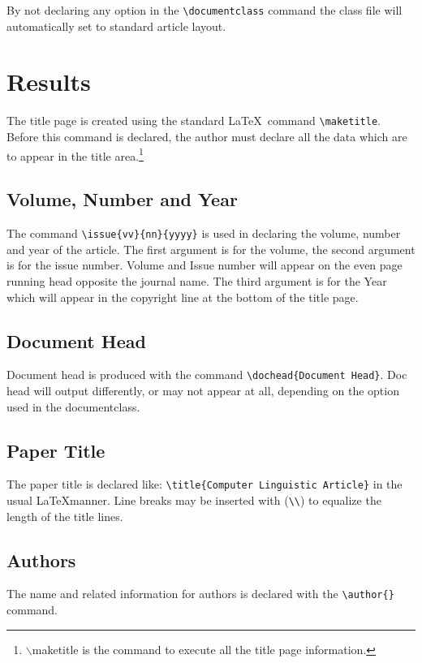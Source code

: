 \documentclass{clv3}
\begin{document}
By not declaring any option in the \verb|\documentclass| command the class file
will automatically set to standard article layout.

\section{Results}

The title page is created using the standard \LaTeX\ command \verb|\maketitle|.
Before this command is declared, the author must declare all the data which are
to appear in the title area.\footnote{$\backslash$maketitle is the command to execute all the title page information.}

\subsection{Volume, Number and Year}

The command \verb|\issue{vv}{nn}{yyyy}| is used in declaring the volume, number
and year of the article. The first argument is for the volume, the second argument
is for the issue number. Volume and Issue number will appear on the even page
running head opposite the journal name. The third argument is for the Year which
will appear in the copyright line at the bottom of the title page.

\subsection{Document Head}

Document head is produced with the command \verb|\dochead{Document Head}|. Doc head
will output differently, or may not appear at all, depending on the option used in the
documentclass.

\subsection{Paper Title}

The paper title is declared like: \verb|\title{Computer Linguistic Article}|
in the usual \LaTeX manner. Line breaks may be inserted with (\verb|\\|) to equalize
the length of the title lines.

\subsection{Authors}
The name and related information for authors is declared with the \verb|\author{}| command.
\end{document}
